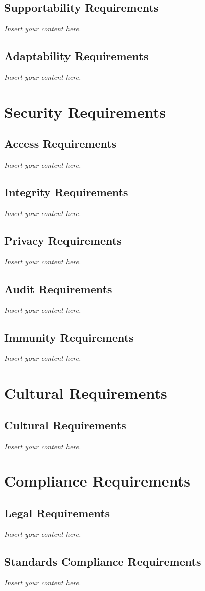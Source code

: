 \documentclass[12pt]{article}
\newcommand{\lips}{\textit{Insert your content here.}}
\begin{document}
\subsection{Supportability Requirements}
\lips
\subsection{Adaptability Requirements}
\lips

\section{Security Requirements}
\subsection{Access Requirements}
\lips
\subsection{Integrity Requirements}
\lips
\subsection{Privacy Requirements}
\lips
\subsection{Audit Requirements}
\lips
\subsection{Immunity Requirements}
\lips

\section{Cultural Requirements}
\subsection{Cultural Requirements}
\lips

\section{Compliance Requirements}
\subsection{Legal Requirements}
\lips
\subsection{Standards Compliance Requirements}
\lips
\end{document}
